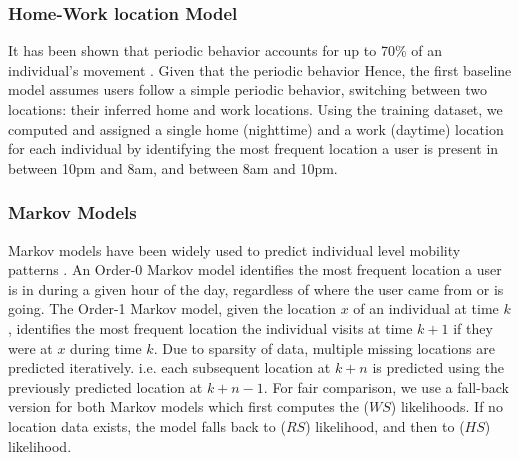 \subsubsection{Home-Work location Model}
It has been shown that periodic behavior accounts for up to 70\% of an individual's movement \cite{133}. Given that the periodic behavior 
Hence, the first baseline model 
assumes users follow a simple periodic behavior, switching between two locations: their inferred home and work locations. Using the training dataset, we computed and assigned a single home (nighttime) and a work (daytime) location for each individual by identifying the most frequent location a user is present in
between 10pm and 8am, and between 8am and 10pm.

\subsubsection{Markov Models}
Markov models have been widely used to predict individual level mobility patterns \cite{112,134}. An Order-0 Markov model
identifies the most frequent location a user is in during a given hour of the day, regardless of where the user came from or is going\cite{134}.
The Order-1 Markov model, 
given the location $x$ of an individual at time $k$, 
identifies the most frequent location the individual visits at time $k+1$ if they were at $x$ during time $k$. Due to sparsity of data, multiple missing locations are predicted iteratively.
i.e. each subsequent location at $k+n$ is predicted using the previously predicted location at $k+n-1$.
For fair comparison, we use a fall-back version for both Markov models which first computes the ($WS$) likelihoods. If no location data exists, the model falls back to ($RS$) likelihood, and then to ($HS$) likelihood. 

